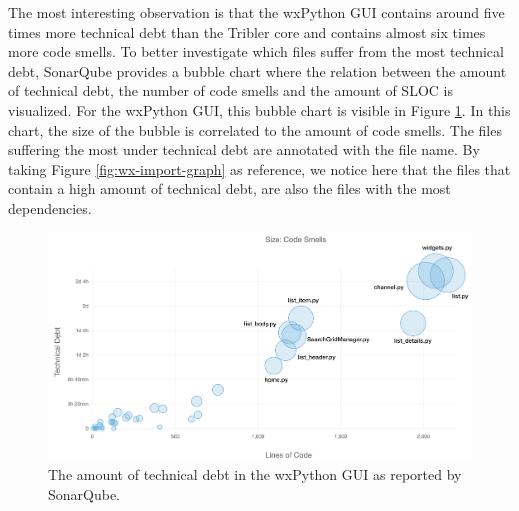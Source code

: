 The most interesting observation is that the wxPython GUI contains around five times more technical debt than the Tribler core and contains almost six times more code smells. To better investigate which files suffer from the most technical debt, SonarQube provides a bubble chart where the relation between the amount of technical debt, the number of code smells and the amount of SLOC is visualized. For the wxPython GUI, this bubble chart is visible in Figure \ref{fig:technical-debt-wx-gui}. In this chart, the size of the bubble is correlated to the amount of code smells. The files suffering the most under technical debt are annotated with the file name. By taking Figure \ref{fig:wx-import-graph} as reference, we notice here that the files that contain a high amount of technical debt, are also the files with the most dependencies.\\

\begin{figure}[h!]
	\centering
	\includegraphics[width=1.0\columnwidth]{images/improving_qa/technical_debt_wx_gui}
	\caption{The amount of technical debt in the wxPython GUI as reported by SonarQube.}
	\label{fig:technical-debt-wx-gui}
\end{figure}

